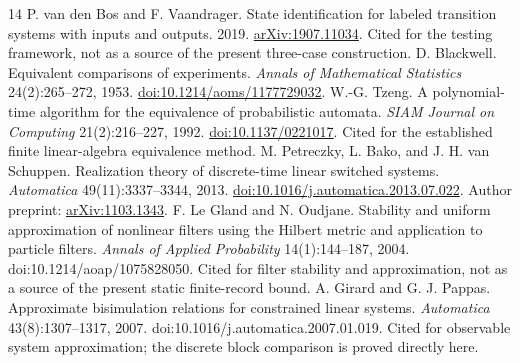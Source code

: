 \documentclass[11pt,letterpaper]{article}
\theoremstyle{plain}
\theoremstyle{definition}
\begin{document}
\begin{thebibliography}{14}
 P. van den Bos and F. Vaandrager. State identification for labeled transition systems with inputs and outputs. 2019. \href{https://arxiv.org/abs/1907.11034}{arXiv:1907.11034}. Cited for the testing framework, not as a source of the present three-case construction.
 D. Blackwell. Equivalent comparisons of experiments. \emph{Annals of Mathematical Statistics} 24(2):265--272, 1953. \href{https://doi.org/10.1214/aoms/1177729032}{doi:10.1214/aoms/1177729032}.
 W.-G. Tzeng. A polynomial-time algorithm for the equivalence of probabilistic automata. \emph{SIAM Journal on Computing} 21(2):216--227, 1992. \href{https://doi.org/10.1137/0221017}{doi:10.1137/0221017}. Cited for the established finite linear-algebra equivalence method.
 M. Petreczky, L. Bako, and J. H. van Schuppen. Realization theory of discrete-time linear switched systems. \emph{Automatica} 49(11):3337--3344, 2013. \href{https://doi.org/10.1016/j.automatica.2013.07.022}{doi:10.1016/j.automatica.2013.07.022}. Author preprint: \href{https://arxiv.org/abs/1103.1343}{arXiv:1103.1343}.
 F. Le Gland and N. Oudjane. Stability and uniform approximation of nonlinear filters using the Hilbert metric and application to particle filters. \emph{Annals of Applied Probability} 14(1):144--187, 2004. doi:10.1214/aoap/1075828050. Cited for filter stability and approximation, not as a source of the present static finite-record bound.
 A. Girard and G. J. Pappas. Approximate bisimulation relations for constrained linear systems. \emph{Automatica} 43(8):1307--1317, 2007. doi:10.1016/j.automatica.2007.01.019. Cited for observable system approximation; the discrete block comparison is proved directly here.
\end{thebibliography}
\end{document}
